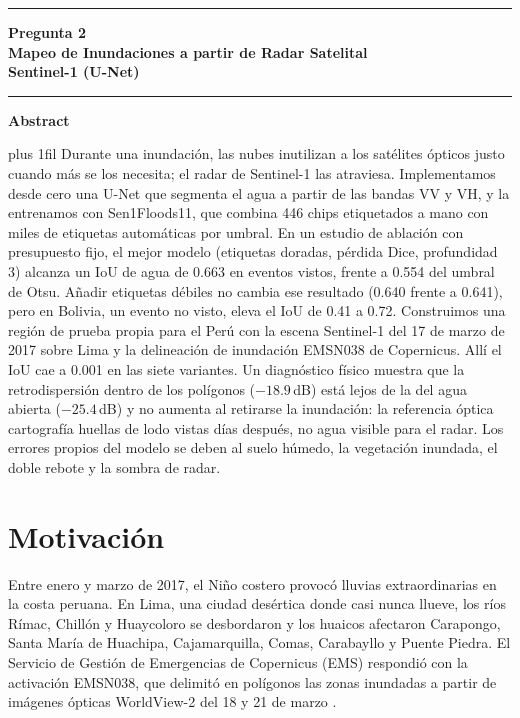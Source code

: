 \documentclass[10pt]{article}
\begin{document}
\thispagestyle{plain}
\begin{center}
\rule{\linewidth}{3pt}\par\vspace{10pt}
{\fontsize{17}{20.5}\selectfont\bfseries Pregunta 2\\
Mapeo de Inundaciones a partir de Radar Satelital\\ Sentinel-1 (U-Net)\par}
\vspace{8pt}\rule{\linewidth}{1pt}\par\vspace{18pt}
{\fontsize{12}{14}\selectfont\bfseries Abstract\par}
\end{center}
\vspace{-2pt}
{\leftskip=0.5in\rightskip=0.5in\parfillskip=0pt plus 1fil\noindent
Durante una inundación, las nubes inutilizan a los satélites ópticos justo cuando más se los necesita; el radar de Sentinel-1 las atraviesa. Implementamos desde cero una U-Net que segmenta el agua a partir de las bandas VV y VH, y la entrenamos con Sen1Floods11, que combina 446 chips etiquetados a mano con miles de etiquetas automáticas por umbral. En un estudio de ablación con presupuesto fijo, el mejor modelo (etiquetas doradas, pérdida Dice, profundidad 3) alcanza un IoU de agua de 0.663 en eventos vistos, frente a 0.554 del umbral de Otsu. Añadir etiquetas débiles no cambia ese resultado (0.640 frente a 0.641), pero en Bolivia, un evento no visto, eleva el IoU de 0.41 a 0.72. Construimos una región de prueba propia para el Perú con la escena Sentinel-1 del 17 de marzo de 2017 sobre Lima y la delineación de inundación EMSN038 de Copernicus. Allí el IoU cae a 0.001 en las siete variantes. Un diagnóstico físico muestra que la retrodispersión dentro de los polígonos ($-18.9$\,dB) está lejos de la del agua abierta ($-25.4$\,dB) y no aumenta al retirarse la inundación: la referencia óptica cartografía huellas de lodo vistas días después, no agua visible para el radar. Los errores propios del modelo se deben al suelo húmedo, la vegetación inundada, el doble rebote y la sombra de radar.\par}

\section{Motivación}
\label{sec:intro}
Entre enero y marzo de 2017, el Niño costero provocó lluvias extraordinarias en la costa peruana. En Lima, una ciudad desértica donde casi nunca llueve, los ríos Rímac, Chillón y Huaycoloro se desbordaron y los huaicos afectaron Carapongo, Santa María de Huachipa, Cajamarquilla, Comas, Carabayllo y Puente Piedra. El Servicio de Gestión de Emergencias de Copernicus (EMS) respondió con la activación EMSN038, que delimitó en polígonos las zonas inundadas a partir de imágenes ópticas WorldView-2 del 18 y 21 de marzo \citep{emsn038}.
\end{document}
